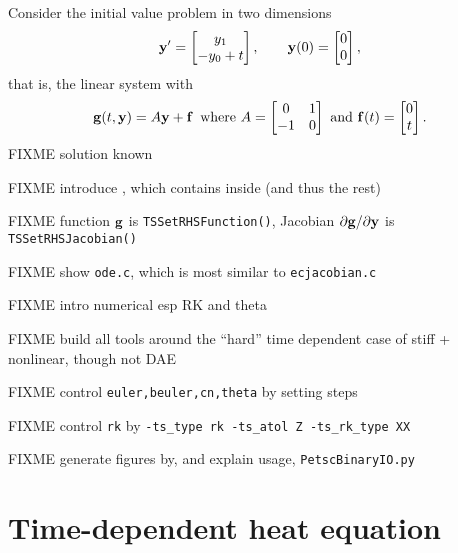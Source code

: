 \noindent\hrulefill
\begin{example}  Consider the initial value problem in two dimensions
\begin{equation}
   \mathbf{y}' = \begin{bmatrix} y_1 \\ - y_0 + t\end{bmatrix}, \qquad \mathbf{y}(0) = \begin{bmatrix} 0 \\ 0 \end{bmatrix}, \label{eq:ts:example}
\end{equation}
that is, the linear system with
    $$\mathbf{g}(t,\mathbf{y}) = A \mathbf{y} + \mathbf{f} \,\text{ where } A = \begin{bmatrix} 0 & 1 \\ -1 & 0 \end{bmatrix} \text{ and } \mathbf{f}(t) = \begin{bmatrix} 0 \\ t\end{bmatrix}.$$
FIXME solution known
\end{example}

FIXME introduce \pTS, which contains \pSNES inside (and thus the rest)

FIXME function $\mathbf{g}$ is \texttt{TSSetRHSFunction()}, Jacobian $\partial \mathbf{g}/\partial \mathbf{y}$ is \texttt{TSSetRHSJacobian()}

FIXME show \texttt{ode.c}, which is most similar to \texttt{ecjacobian.c}

\vfill
\clearpage



FIXME intro numerical esp RK and theta \citep{AscherPetzold1998}

FIXME build all tools around the ``hard'' time dependent case of stiff + nonlinear, though not DAE

FIXME control \texttt{euler,beuler,cn,theta} by setting steps

FIXME control \texttt{rk} by \texttt{-ts\_type rk -ts\_atol Z -ts\_rk\_type XX}

FIXME generate figures by, and explain usage, \texttt{PetscBinaryIO.py}

\section{Time-dependent heat equation}

